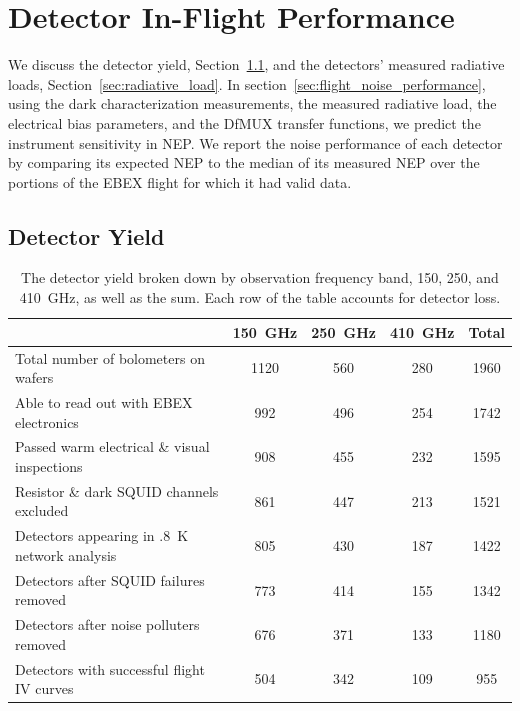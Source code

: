\chapter{Detector In-Flight Performance}
\label{operation_chapter}

We discuss the detector yield, Section~\ref{sec:yield}, and the detectors' measured radiative loads, Section~\ref{sec:radiative_load}.
In section~\ref{sec:flight_noise_performance}, using the dark characterization measurements, the measured radiative load, the electrical bias parameters, and the \ac{DfMUX} transfer functions, we predict the instrument sensitivity in \ac{NEP}. 
We report the noise performance of each detector by comparing its expected \ac{NEP} to the median of its measured \ac{NEP} over the portions of the \ac{EBEX} flight for which it had valid data. 


\section{Detector Yield}
\label{sec:yield}

\begin{table}[ht!]
\begin{center}
\begin{tabular}{l|c|c|c|c}
  & 150~GHz & 250~GHz & 410~GHz & Total \\
\hline Total number of bolometers on wafers & 1120 & 560 & 280 & 1960 \\
\hline Able to read out with \ac{EBEX} electronics & 992 & 496 & 254 & 1742 \\
\hline Passed warm electrical \& visual inspections & 908 & 455 & 232 & 1595 \\
\hline Resistor \& dark \ac{SQUID} channels excluded & 861 & 447 & 213 & 1521 \\
\hline Detectors appearing in .8~K network analysis & 805 & 430 & 187 & 1422 \\
\hline Detectors after SQUID failures removed & 773 & 414 & 155 & 1342 \\
\hline Detectors after noise polluters removed & 676 & 371 & 133 & 1180 \\
\hline Detectors with successful flight IV curves & 504 & 342 & 109 & 955 \\
\hline
\end{tabular}
\end{center}
\caption[Detector yield]{The detector yield broken down by observation frequency band, 150, 250, and 410~GHz, as well as the sum. Each row of the table accounts for detector loss.}
\label{yield_table}
\end{table}

